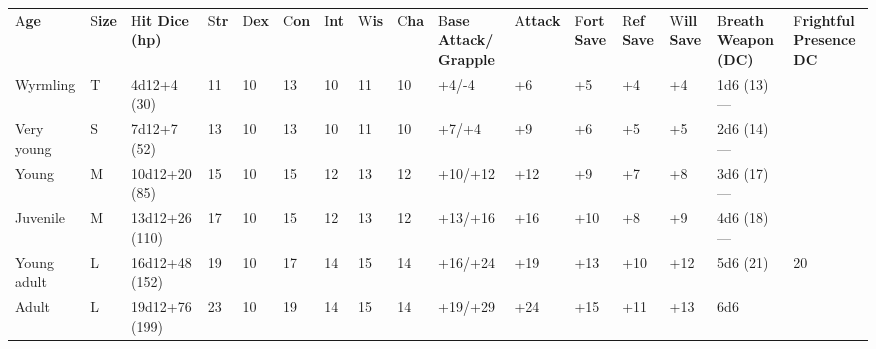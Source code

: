 \documentclass{article}
\begin{document}
\vspace{12pt}
\begin{tabular}{|>{\raggedright}p{18pt}|>{\raggedright}p{6pt}|>{\raggedright}p{17pt}|>{\raggedright}p{4pt}|>{\raggedright}p{6pt}|>{\raggedright}p{6pt}|>{\raggedright}p{4pt}|>{\raggedright}p{6pt}|>{\raggedright}p{6pt}|>{\raggedright}p{13pt}|>{\raggedright}p{11pt}|>{\raggedright}p{7pt}|>{\raggedright}p{7pt}|>{\raggedright}p{7pt}|>{\raggedright}p{16pt}|>{\raggedright}p{17pt}|}
\hline
\multicolumn{16}{|p{158pt}|}{B\textbf{rass Dragons by Age}}\tabularnewline
\hline
A{\small{}\textbf{ge}} & S{\small{}\textbf{ize}} & H{\small{}\textbf{it Dice (hp)}} & S{\small{}\textbf{tr}} & D{\small{}\textbf{ex}} & C{\small{}\textbf{on}} & I{\small{}\textbf{nt}} & W{\small{}\textbf{is}} & C{\small{}\textbf{ha}} & B{\small{}\textbf{ase 
Attack/}}\linebreak{}
{\small{}\textbf{Grapple}} & A{\small{}\textbf{ttack}} & F{\small{}\textbf{ort 
Save}} & R{\small{}\textbf{ef Save}} & W{\small{}\textbf{ill Save}} & B{\small{}\textbf{reath 
Weapon (DC)}} & F{\small{}\textbf{rightful Presence DC}}\tabularnewline
\hline
W{\small{}yrmling} & T & 4{\small{}d12+4 (30)} & 1{\small{}1} & 1{\small{}0} & 1{\small{}3} & 1{\small{}0} & 1{\small{}1} & 1{\small{}0} & +{\small{}4/-4} & +{\small{}6} & +{\small{}5} & +{\small{}4} & +{\small{}4} & 1{\small{}d6 
(13)}--- & \tabularnewline
\hline
V{\small{}ery young} & S & 7{\small{}d12+7 (52)} & 1{\small{}3} & 1{\small{}0} & 1{\small{}3} & 1{\small{}0} & 1{\small{}1} & 1{\small{}0} & +{\small{}7/+4} & +{\small{}9} & +{\small{}6} & +{\small{}5} & +{\small{}5} & 2{\small{}d6 
(14)}--- & \tabularnewline
\hline
Y{\small{}oung} & M & 1{\small{}0d12+20 (85)} & 1{\small{}5} & 1{\small{}0} & 1{\small{}5} & 1{\small{}2} & 1{\small{}3} & 1{\small{}2} & +{\small{}10/+12} & +{\small{}12} & +{\small{}9} & +{\small{}7} & +{\small{}8} & 3{\small{}d6 
(17)}--- & \tabularnewline
\hline
J{\small{}uvenile} & M & 1{\small{}3d12+26 (110)} & 1{\small{}7} & 1{\small{}0} & 1{\small{}5} & 1{\small{}2} & 1{\small{}3} & 1{\small{}2} & +{\small{}13/+16} & +{\small{}16} & +{\small{}10} & +{\small{}8} & +{\small{}9} & 4{\small{}d6 
(18)}--- & \tabularnewline
\hline
Y{\small{}oung adult} & L & 1{\small{}6d12+48 (152)} & 1{\small{}9} & 1{\small{}0} & 1{\small{}7} & 1{\small{}4} & 1{\small{}5} & 1{\small{}4} & +{\small{}16/+24} & +{\small{}19} & +{\small{}13} & +{\small{}10} & +{\small{}12} & 5{\small{}d6 
(21)} & 2{\small{}0}\tabularnewline
\hline
A{\small{}dult} & L & 1{\small{}9d12+76 (199)} & 2{\small{}3} & 1{\small{}0} & 1{\small{}9} & 1{\small{}4} & 1{\small{}5} & 1{\small{}4} & +{\small{}19/+29} & +{\small{}24} & +{\small{}15} & +{\small{}11} & +{\small{}13} & 6{\small{}d6 
}
\end{tabular}
\end{document}
